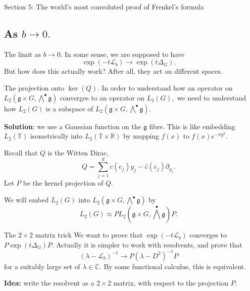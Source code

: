 \documentclass{beamer}
\numberwithin{equation}{section}
\theoremstyle{plain}
\theoremstyle{plain}
\theoremstyle{definition}
\theoremstyle{plain}
\theoremstyle{plain}
\theoremstyle{definition}
\newcommand{\Rl}{\mathbb{R}}
\newcommand{\Cplx}{\mathbb{C}}
\newcommand{\Circ}{\mathbb{T}}
\newcommand{\Lc}{\mathcal{L}}
\newcommand{\gf}{\mathfrak{g}}
\begin{document}
\begin{frame}
  \huge{Section 5: The world's most convoluted proof of Frenkel's formula}
\end{frame}

\subsection{As $b\to 0.$}

\begin{frame}{The limit as $b\to 0.$}
    In some sense, we are supposed to have
    \[
      \exp(-t\Lc_b)\rightarrow \exp(t\Delta_G).
    \]
    But how does this actually work? After all, they act on different spaces.
\end{frame}

\begin{frame}{The projection onto $\ker(Q).$}
  In order to understand how an operator on $L_2(\gf\times G,\bigwedge^{\bullet}\gf)$ converges to an operator on
  $L_2(G),$ we need to understand how $L_2(G)$ is a subspace of $L_2(\gf\times G,\bigwedge^{\bullet}\gf).$

  \textbf{Solution}: we use a Gaussian function on the $\gf$ fibre.
  This is like embedding $L_2(\Circ)$ isometrically into $L_2(\Circ\times \Rl)$ by mapping $f(x)$ to $f(x)e^{-\pi y^2}.$

  \begin{definition}
    Recall that $Q$ is the Witten Dirac,
    \[
      Q = \sum_{j=1}^d c(e_j)y_j - \widehat{c}(e_j)\partial_{y_j}.
    \]
    Let $P$ be the kernel projection of $Q.$
  \end{definition}
  We will embed $L_2(G)$ into $L_2(\gf\times G,\bigwedge^{\bullet}\gf)$ by
  \[
    L_2(G)\approx  PL_2(\gf\times G,\bigwedge^{\bullet}\gf)P.
  \]
\end{frame}

\begin{frame}{The $2\times 2$ matrix trick}
  We want to prove that $\exp(-t\Lc_b)$ converges to $P\exp(t\Delta_G)P.$ Actually it is simpler to work with resolvents, and prove that
  \[
    (\lambda-\Lc_b)^{-1} \rightarrow P(\lambda-D^2)^{-1}P
  \]
  for a suitably large set of $\lambda\in \Cplx.$ By some functional calculus, this is equivalent.

  \textbf{Idea:} write the resolvent as a $2\times 2$ matrix, with respect to the projection $P.$
\end{frame}
\end{document}
